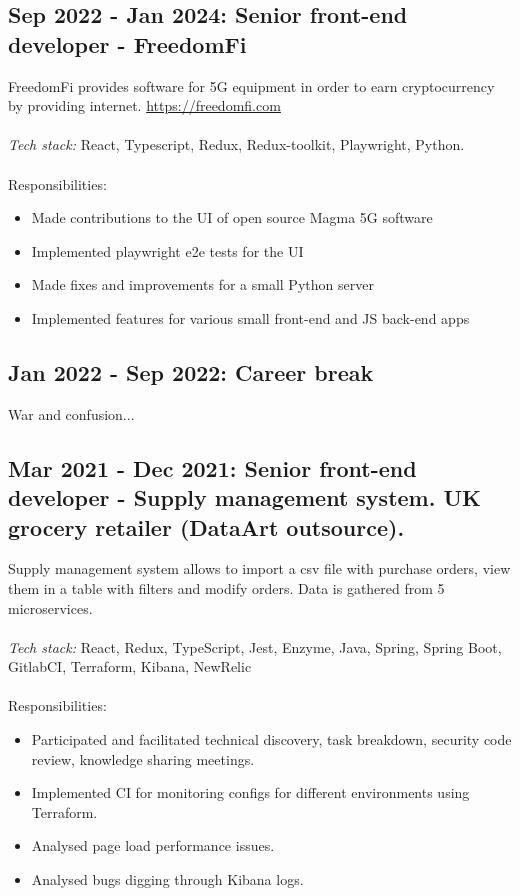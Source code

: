 \documentclass[a4paper, 14pt]{article}
\begin{document}
  \subsection{Sep 2022 - Jan 2024: Senior front-end developer - FreedomFi}

  FreedomFi provides software for 5G equipment in order to earn cryptocurrency by providing internet. \url{https://freedomfi.com} \\
  \\
  \textit{Tech stack:} React, Typescript, Redux, Redux-toolkit, Playwright, Python. \\
  \\
  Responsibilities:
    \begin{itemize}
      \item Made contributions to the UI of open source Magma 5G software \\
      \item Implemented playwright e2e tests for the UI \\
      \item Made fixes and improvements for a small Python server \\
      \item Implemented features for various small front-end and JS back-end apps
    \end{itemize}

  \subsection{Jan 2022 - Sep 2022: Career break}
    War and confusion...

  \subsection{Mar 2021 - Dec 2021: Senior front-end developer - Supply management system. UK grocery retailer (DataArt outsource).}
  Supply management system allows to import a csv file with purchase orders, view them in a table with filters and modify orders. Data is gathered from 5 microservices. \\
  \\
  \textit{Tech stack:} React, Redux, TypeScript, Jest, Enzyme, Java, Spring, Spring Boot, GitlabCI, Terraform, Kibana, NewRelic \\
  \\
  Responsibilities:
    \begin{itemize}
      \item Participated and facilitated technical discovery, task breakdown, security code review, knowledge sharing meetings. \\
      \item Implemented CI for monitoring configs for different environments using Terraform. \\
      \item Analysed page load performance issues. \\
      \item Analysed bugs digging through Kibana logs. \\
    \end{itemize}
\end{document}
